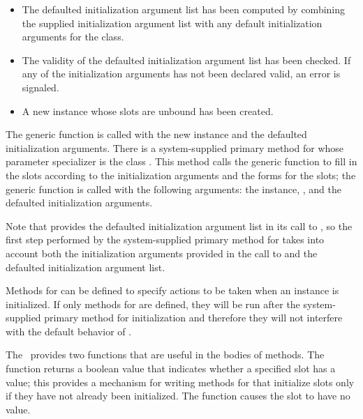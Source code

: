 \begin{itemize} 

\item  The defaulted initialization argument list has been computed by
combining the supplied initialization argument list with any default
initialization arguments for the class.

\item  The validity of the defaulted initialization argument
list has been checked.  If any of the initialization arguments has not
been declared valid, an error is signaled.

\item  A new instance whose slots are unbound has been created.

\end{itemize}

The generic function  is called with the
new instance and the defaulted initialization arguments.  There is
a system-supplied primary method for 
whose parameter specializer is the class .  This
method calls the generic function  to fill in
the slots according to the initialization arguments and the 
 forms for the slots; the generic function 
 is called with the following arguments: the instance,
, and the defaulted initialization arguments.

Note that  provides the defaulted
initialization argument list in its call to ,
so the first step performed by the system-supplied primary method for
 takes into account both the initialization
arguments provided in the call to  and the
defaulted initialization argument list.

Methods for  can be defined to specify
actions to be taken when an instance is initialized.  If only 
methods for  are defined, they will be
run after the system-supplied primary method for initialization and
therefore they will not interfere with the default behavior of 
.

The \OS\ provides two functions that are useful in the bodies of 
 methods.  The function 
returns a boolean value that indicates whether a specified slot has a
value; this provides a mechanism for writing  methods for
 that initialize slots only if they have
not already been initialized.  The function 
causes the slot to have no value.


